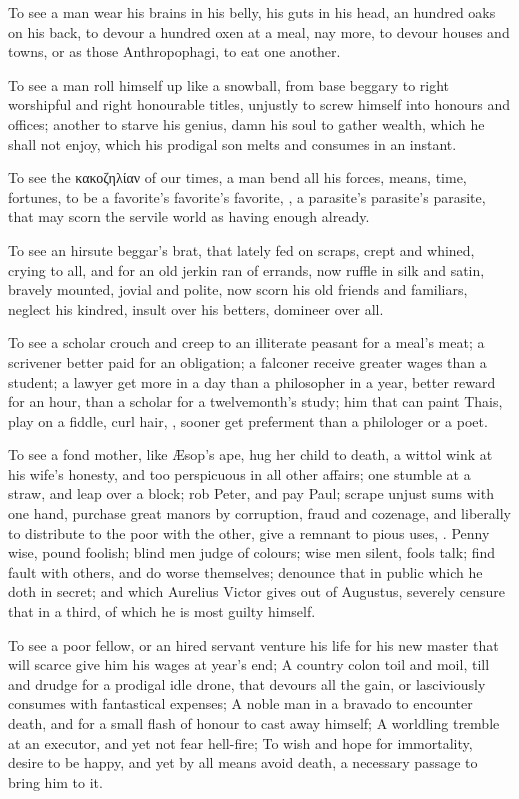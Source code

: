 {To see a man wear his brains in his belly, his guts in his head,
an hundred oaks on his back, to devour a hundred oxen at a meal, nay
more, to devour houses and towns, or as those Anthropophagi, to
eat one another.

To see a man roll himself up like a snowball, from base beggary to
right worshipful and right honourable titles, unjustly to screw himself
into honours and offices; another to starve his genius, damn his soul
to gather wealth, which he shall not enjoy, which his prodigal son
melts and consumes in an instant. 

To see the κακοζηλίαν of our times, a man bend all his forces, means,
time, fortunes, to be a favorite's favorite's favorite, \etc{}, a
parasite's parasite's parasite, that may scorn the servile world as
having enough already.

To see an hirsute beggar's brat, that lately fed on scraps, crept and
whined, crying to all, and for an old jerkin ran of errands, now ruffle
in silk and satin, bravely mounted, jovial and polite, now scorn his
old friends and familiars, neglect his kindred, insult over his
betters, domineer over all.

To see a scholar crouch and creep to an illiterate peasant for a meal's
meat; a scrivener better paid for an obligation; a falconer receive
greater wages than a student; a lawyer get more in a day than a
philosopher in a year, better reward for an hour, than a scholar for a
twelvemonth's study; him that can paint Thais, play on a fiddle,
curl hair, \etc{}, sooner get preferment than a philologer or a poet.

To see a fond mother, like \AE{}sop's ape, hug her child to death, a 
wittol wink at his wife's honesty, and too perspicuous in all other
affairs; one stumble at a straw, and leap over a block; rob Peter, and
pay Paul; scrape unjust sums with one hand, purchase great manors by
corruption, fraud and cozenage, and liberally to distribute to the poor
with the other, give a remnant to pious uses, \etc{}. Penny wise, pound
foolish; blind men judge of colours; wise men silent, fools talk; 
find fault with others, and do worse themselves; denounce that in
public which he doth in secret; and which Aurelius Victor gives out of
Augustus, severely censure that in a third, of which he is most guilty
himself.

To see a poor fellow, or an hired servant venture his life for his new
master that will scarce give him his wages at year's end; A country
colon toil and moil, till and drudge for a prodigal idle drone, that
devours all the gain, or lasciviously consumes with fantastical
expenses; A noble man in a bravado to encounter death, and for a small
flash of honour to cast away himself; A worldling tremble at an
executor, and yet not fear hell-fire; To wish and hope for immortality,
desire to be happy, and yet by all means avoid death, a necessary
passage to bring him to it.

}
